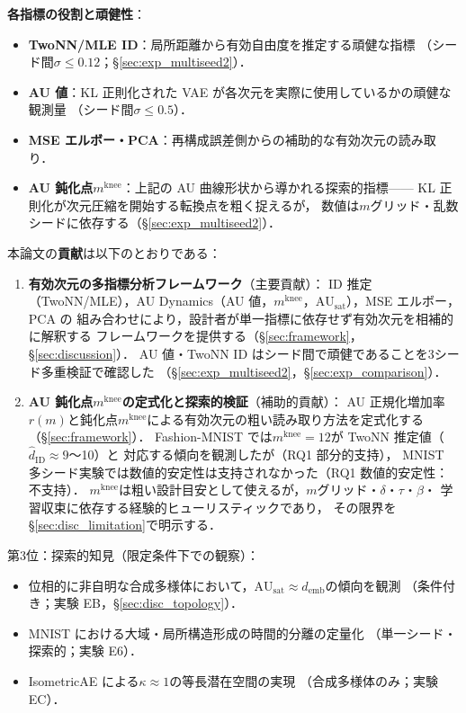 \documentclass[11pt,a4paper]{jsarticle}
\newcommand{\kap}{\kappa}
\newcommand{\AUsat}{\mathrm{AU}_{\mathrm{sat}}}
\newcommand{\mknee}{m^{\mathrm{knee}}}
\newcommand{\demb}{d_{\mathrm{emb}}}
\begin{document}
\textbf{各指標の役割と頑健性}：
\begin{itemize}
  \item \textbf{TwoNN/MLE ID}：局所距離から有効自由度を推定する頑健な指標
        （シード間$\sigma \leq 0.12$；§\ref{sec:exp_multiseed2}）．
  \item \textbf{AU 値}：KL 正則化された VAE が各次元を実際に使用しているかの頑健な観測量
        （シード間$\sigma \leq 0.5$）．
  \item \textbf{MSE エルボー・PCA}：再構成誤差側からの補助的な有効次元の読み取り．
  \item \textbf{AU 鈍化点$\mknee$}：上記の AU 曲線形状から導かれる探索的指標——
        KL 正則化が次元圧縮を開始する転換点を粗く捉えるが，
        数値は$m$グリッド・乱数シードに依存する（§\ref{sec:exp_multiseed2}）．
\end{itemize}

本論文の\textbf{貢献}は以下のとおりである：
\begin{enumerate}
  \item \textbf{有効次元の多指標分析フレームワーク}（主要貢献）：
        ID 推定（TwoNN/MLE），AU Dynamics（AU 値，$\mknee$，$\AUsat$），MSE エルボー，PCA の
        組み合わせにより，設計者が単一指標に依存せず有効次元を相補的に解釈する
        フレームワークを提供する（§\ref{sec:framework}，§\ref{sec:discussion}）．
        AU 値・TwoNN ID はシード間で頑健であることを3シード多重検証で確認した
        （§\ref{sec:exp_multiseed2}，§\ref{sec:exp_comparison}）．
  \item \textbf{AU 鈍化点$\mknee$の定式化と探索的検証}（補助的貢献）：
        AU 正規化増加率$r(m)$と鈍化点$\mknee$による有効次元の粗い読み取り方法を定式化する
        （§\ref{sec:framework}）．
        Fashion-MNIST では$\mknee = 12$が TwoNN 推定値（$\hat{d}_\mathrm{ID} \approx 9$〜10）と
        対応する傾向を観測したが（RQ1 部分的支持），
        MNIST 多シード実験では数値的安定性は支持されなかった（RQ1 数値的安定性：不支持）．
        $\mknee$は粗い設計目安として使えるが，$m$グリッド・$\delta$・$\tau$・$\beta$・
        学習収束に依存する経験的ヒューリスティックであり，
        その限界を§\ref{sec:disc_limitation}で明示する．
\end{enumerate}

第3位：探索的知見（限定条件下での観察）：
\begin{itemize}
  \item 位相的に非自明な合成多様体において，$\AUsat \approx \demb$の傾向を観測
        （条件付き；実験 EB，§\ref{sec:disc_topology}）．
  \item MNIST における大域・局所構造形成の時間的分離の定量化
        （単一シード・探索的；実験 E6）．
  \item IsometricAE による$\kap \approx 1$の等長潜在空間の実現
        （合成多様体のみ；実験 EC）．
\end{itemize}
\end{document}
